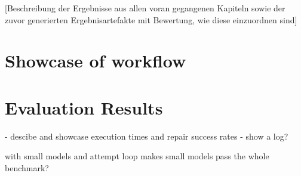 
[Beschreibung der Ergebnisse aus allen voran gegangenen Kapiteln sowie der zuvor generierten Ergebnisartefakte mit Bewertung, wie diese einzuordnen sind]

\section{Showcase of workflow}


\section{Evaluation Results}


- descibe and showcase execution times and repair success rates
- show a log?


with small models and attempt loop makes small models pass the whole benchmark?